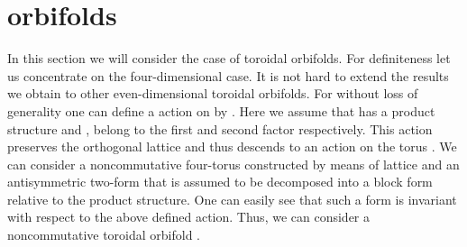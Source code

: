 \documentclass[a4paper,a4paper]{article}
\begin{document}
{\section{\coordHE{} orbifolds}
In this section we will consider the case of toroidal \coordHE{} orbifolds. For definiteness let us 
concentrate on the four-dimensional case. It is not hard to extend the results we  obtain to other 
even-dimensional  \coordHE{} toroidal orbifolds. For \coordHE{} without loss of generality one can define a  \coordHE{} action on \coordHE{} by
\coordHE{}. Here we assume that \coordHE{} has a product structure \coordHE{} and 
    \coordHE{}, \coordHE{}  belong   to the first and second \coordHE{} factor respectively. This action preserves the orthogonal 
lattice \coordHE{} and thus descends to an action on the torus \coordHE{}. 
We can consider a noncommutative four-torus \coordHE{} constructed by means of lattice \coordHE{} and an antisymmetric 
two-form \coordHE{} that is assumed to be decomposed into a \coordHE{} block form relative to the  \coordHE{} 
product   structure. One can easily see that such a form is invariant with respect to the above defined  \coordHE{} action.  
Thus, we can consider a noncommutative toroidal orbifold \coordHE{}. 


}
\end{document}
